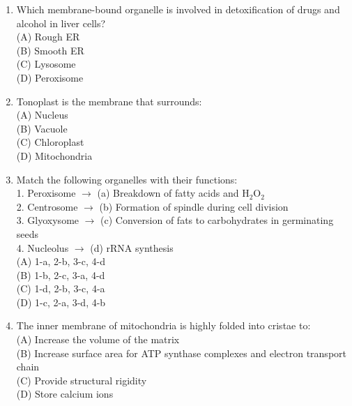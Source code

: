 \documentclass{article}
\begin{document}
\begin{enumerate}[label=Q\arabic*.]
\item Which membrane-bound organelle is involved in detoxification of drugs and alcohol in liver cells?
\\(A) Rough ER
\\(B) Smooth ER
\\(C) Lysosome
\\(D) Peroxisome

\item Tonoplast is the membrane that surrounds:
\\(A) Nucleus
\\(B) Vacuole
\\(C) Chloroplast
\\(D) Mitochondria

\item Match the following organelles with their functions:\\
1. Peroxisome $\rightarrow$ (a) Breakdown of fatty acids and H$_2$O$_2$\\
2. Centrosome $\rightarrow$ (b) Formation of spindle during cell division\\
3. Glyoxysome $\rightarrow$ (c) Conversion of fats to carbohydrates in germinating seeds\\
4. Nucleolus $\rightarrow$ (d) rRNA synthesis
\\(A) 1-a, 2-b, 3-c, 4-d
\\(B) 1-b, 2-c, 3-a, 4-d
\\(C) 1-d, 2-b, 3-c, 4-a
\\(D) 1-c, 2-a, 3-d, 4-b

\item The inner membrane of mitochondria is highly folded into cristae to:
\\(A) Increase the volume of the matrix
\\(B) Increase surface area for ATP synthase complexes and electron transport chain
\\(C) Provide structural rigidity
\\(D) Store calcium ions

\end{enumerate}
\end{document}
